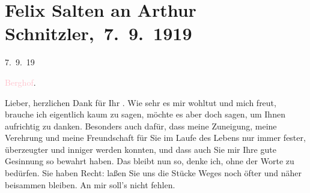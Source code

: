 

\renewcommand{\erwaehntePersonen}{Personen: Frieda Pollak, Felix Salten, Ottilie Salten, Olga Schnitzler}
\renewcommand{\erwaehnteOrte}{Orte: Berghof, Salzburg, Unterach am Attersee, Wien}
\renewcommand{\erwaehnteWerke}{Werke: Felix Saltens fünfzigster Geburtstag, Neue Freie Presse}
\section[ Felix Salten an Arthur Schnitzler, 7. 9. 1919]{Felix Salten an Arthur Schnitzler, 7. 9. 1919}
\nopagebreak{}
\rehead{ }\normalsize\beginnumbering{}
\toendnotes[C]{\smallbreak\pagebreak[2]}
\toendnotes[C]{\smallbreak}
\pstart
           \raggedleft{}{\pb}7. 9. 19\pend
           
\pstart
           \raggedleft{}\textcolor{pink}{Berghof}{}\ledrightnote{\textcolor{pink}{Berghof}}.\pend
           
\pstart{}Lieber,\pend
\pstart
           herzlichen Dank für Ihr \label{K_L03568-1v}\label{K_L03568-1h}. Wie sehr es mir wohltut
               und mich freut, brauche ich eigentlich kaum zu sagen, möchte es aber doch sagen, um
               Ihnen aufrichtig zu danken. Besonders auch dafür, dass meine Zuneigung, meine
               Verehrung und meine Freundschaft für Sie im Laufe des Lebens nur immer fester,
               überzeugter und inniger werden konnten, und dass auch Sie mir Ihre gute Gesinnung so
               bewahrt haben. Das bleibt nun so, denke ich, ohne der Worte zu bedürfen. Sie haben
               Recht: laßen Sie uns die Stücke Weges noch öfter und näher beisammen bleiben. An mir
               soll’s {\pb}nicht fehlen.\pend
           
